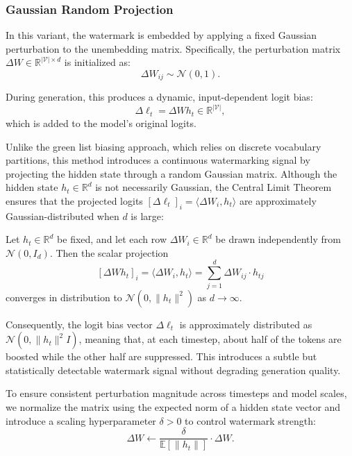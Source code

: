 \subsubsection{Gaussian Random Projection}

In this variant, the watermark is embedded by applying a fixed Gaussian perturbation to the unembedding matrix. Specifically, the perturbation matrix \( \Delta W \in \mathbb{R}^{|\mathcal{V}| \times d} \) is initialized as:
\begin{equation}
    \Delta W_{ij} \sim \mathcal{N}(0, 1).
\end{equation}

During generation, this produces a dynamic, input-dependent logit bias:
\[
    \Delta \ell_t = \Delta W h_t \in \mathbb{R}^{|\mathcal{V}|},
\]
which is added to the model’s original logits.

Unlike the green list biasing approach, which relies on discrete vocabulary partitions, this method introduces a continuous watermarking signal by projecting the hidden state through a random Gaussian matrix. Although the hidden state \( h_t \in \mathbb{R}^d \) is not necessarily Gaussian, the Central Limit Theorem ensures that the projected logits \( [\Delta \ell_t]_i = \langle \Delta W_i, h_t \rangle \) are approximately Gaussian-distributed when \( d \) is large:

\begin{theorem}
    Let \( h_t \in \mathbb{R}^d \) be fixed, and let each row \( \Delta W_i \in \mathbb{R}^d \) be drawn independently from \( \mathcal{N}(0, I_d) \). Then the scalar projection
    \[
        [\Delta W h_t]_i = \langle \Delta W_i, h_t \rangle = \sum_{j=1}^d \Delta W_{ij} \cdot h_{tj}
    \]
    converges in distribution to \( \mathcal{N}(0, \|h_t\|^2) \) as \( d \to \infty \).
\end{theorem}

Consequently, the logit bias vector \( \Delta \ell_t \) is approximately distributed as \( \mathcal{N}(0, \|h_t\|^2 I) \), meaning that, at each timestep, about half of the tokens are boosted while the other half are suppressed. This introduces a subtle but statistically detectable watermark signal without degrading generation quality.

To ensure consistent perturbation magnitude across timesteps and model scales, we normalize the matrix using the expected norm of a hidden state vector and introduce a scaling hyperparameter \( \delta > 0 \) to control watermark strength:
\begin{equation}
    \Delta W \leftarrow \frac{\delta}{\mathbb{E}[\|h_t\|]} \cdot \Delta W.
\end{equation}

